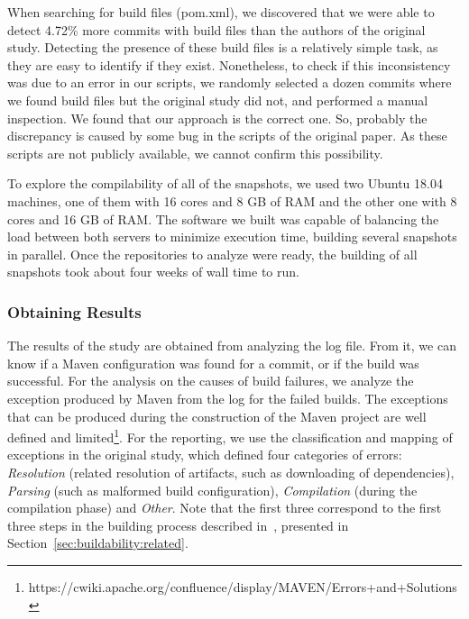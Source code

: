 When searching for build files (pom.xml), we discovered that we were able to detect 4.72\% more commits with build files than the authors of the original study.
Detecting the presence of these build files is a relatively simple task, as they are easy to identify if they exist.
Nonetheless, to check if this inconsistency was due to an error in our scripts, we randomly selected a dozen commits where we found build files but the original study did not, and performed a manual inspection.
We found that our approach is the correct one.
So, probably the discrepancy is caused by some bug in the scripts of the original paper. As these scripts are not publicly available, we cannot confirm this possibility.

To explore the compilability of all of the snapshots, we used two Ubuntu 18.04 machines, one of them with 16 cores and 8 GB of RAM and the other one with 8 cores and 16 GB of RAM. The software we built was capable of balancing the load between both servers to minimize execution time, building several snapshots in parallel. Once the repositories to analyze were ready, the building of all snapshots took about four weeks of wall time to run.

\subsubsection{Obtaining Results}

The results of the study are obtained from analyzing the log file. From it, we can know if a Maven configuration was found for a commit, or if the build was successful. For the analysis on the causes of build failures, we analyze the exception produced by Maven from the log for the failed builds. The exceptions that can be produced during the construction of the Maven project are well defined and limited\footnote{https://cwiki.apache.org/confluence/display/MAVEN/Errors+and+Solutions}. For the reporting, we use the classification and mapping of exceptions in the original study, which defined four categories of errors: \textit{Resolution} (related resolution of artifacts, such as downloading of dependencies), \textit{Parsing} (such as malformed build configuration), \textit{Compilation} (during the compilation phase) and \textit{Other}. Note that the first three correspond to the first three steps in the building process described in~\cite{Sulir:2016:QSJ:3001878.3001882}, presented in Section~\ref{sec:buildability:related}.

